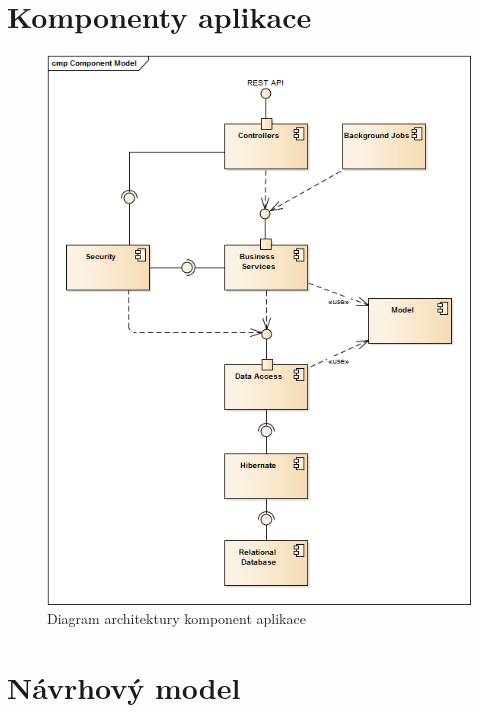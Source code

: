 \documentclass[thesis=B,czech]{FITthesis}[2012/06/26]
\begin{document}
\chapter{Komponenty aplikace}
	\begin{figure}\centering
		\includegraphics[width=1\textwidth]{ea-diagrams/architecture-diagram.png}
		\caption[Diagram komponent]{Diagram architektury komponent aplikace}
		\label{diagram:component-model}
	\end{figure}

\chapter{Návrhový model}
\end{document}
